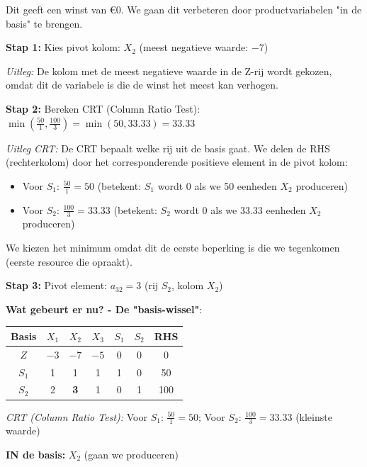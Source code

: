 \documentclass[a4paper,11pt]{article}
\begin{document}
\begin{oefenblok}[title=Productie Optimalisatie bij een Bedrijf]
Dit geeft een winst van €0. We gaan dit verbeteren door productvariabelen "in de basis" te brengen.

\vspace{0.3cm}

\textbf{Stap 1:} Kies pivot kolom: $X_2$ (meest negatieve waarde: $-7$)

\textit{Uitleg:} De kolom met de meest negatieve waarde in de Z-rij wordt gekozen, omdat dit de variabele is die de winst het meest kan verhogen.

\textbf{Stap 2:} Bereken CRT (Column Ratio Test): $\min\left(\frac{50}{1}, \frac{100}{3}\right) = \min(50, 33.33) = 33.33$

\textit{Uitleg CRT:} De CRT bepaalt welke rij uit de basis gaat. We delen de RHS (rechterkolom) door het corresponderende positieve element in de pivot kolom:
\begin{itemize}
    \item Voor $S_1$: $\frac{50}{1} = 50$ (betekent: $S_1$ wordt 0 als we 50 eenheden $X_2$ produceren)
    \item Voor $S_2$: $\frac{100}{3} = 33.33$ (betekent: $S_2$ wordt 0 als we 33.33 eenheden $X_2$ produceren)
\end{itemize}
We kiezen het minimum omdat dit de eerste beperking is die we tegenkomen (eerste resource die opraakt).

\textbf{Stap 3:} Pivot element: $a_{32} = 3$ (rij $S_2$, kolom $X_2$)

\textbf{Wat gebeurt er nu? - De "basis-wissel"}:

\begin{center}
\begin{tabular}{c|ccccc|c}
\hline
Basis & $X_1$ & $X_2$ & $X_3$ & $S_1$ & $S_2$ & RHS \\
\hline
$Z$ & $-3$ & \cellcolor{red!20}$-7$ & $-5$ & 0 & 0 & 0 \\
$S_1$ & 1 & \cellcolor{red!20}1 & 1 & 1 & 0 & 50 \\
\rowcolor{red!20}
$S_2$ & 2 & \textbf{3} & 1 & 0 & 1 & 100 \\
\hline
\end{tabular}
\end{center}

\textit{CRT (Column Ratio Test):} Voor $S_1$: $\frac{50}{1} = 50$; Voor $S_2$: $\frac{100}{3} = 33.33$ (kleinste waarde)

\begin{warningbox}[title=Interpretatie van Pivot-operatie]
\textbf{IN de basis:} $X_2$ (gaan we produceren)


\end{warningbox}
\end{oefenblok}
\end{document}
